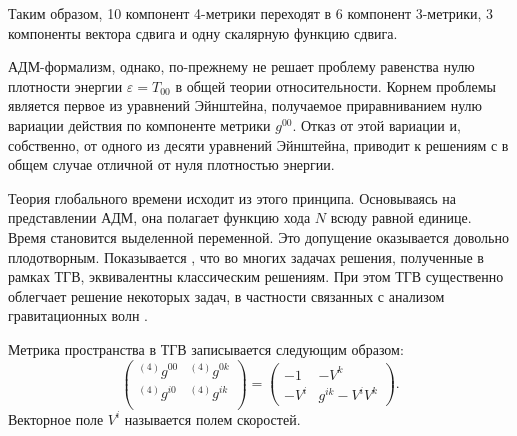 \documentclass[\docroot/reports/draft/report.tex]{subfiles}
\begin{document}
    Таким образом, 10 компонент 4-метрики переходят в 6 компонент 3-метрики, 3 компоненты вектора сдвига и одну скалярную функцию сдвига.

    АДМ-формализм, однако, по-прежнему не решает проблему равенства нулю плотности энергии $\varepsilon = T_{00}$ в общей теории относительности. Корнем проблемы является первое из уравнений Эйнштейна, получаемое приравниванием нулю вариации действия по компоненте метрики $g^{00}$. Отказ от этой вариации и, собственно, от одного из десяти уравнений Эйнштейна, приводит к решениям с в общем случае отличной от нуля плотностью энергии.

    Теория глобального времени исходит из этого принципа. Основываясь на представлении АДМ, она полагает функцию хода $N$ всюду равной единице. Время становится выделенной переменной. Это допущение оказывается довольно плодотворным. Показывается \cite{burlankov_space_dynamics,burlankov_grav_waves}, что во многих задачах решения, полученные в рамках ТГВ, эквивалентны классическим решениям. При этом ТГВ существенно облегчает решение некоторых задач, в частности связанных с анализом гравитационных волн \cite{burlankov_grav_waves}.

    Метрика пространства в ТГВ записывается следующим образом:
    \begin{equation*}
        \begin{pmatrix}
            {}^{(4)}g^{00} & {}^{(4)}g^{0k} \\
            {}^{(4)}g^{i0} & {}^{(4)}g^{ik} \\
        \end{pmatrix} =
        \begin{pmatrix}
            - 1   & - V^k \\
            - V^i & g^{ik} - V^i V^k
        \end{pmatrix} .
    \end{equation*}
    Векторное поле $V^i$ называется полем скоростей.

\end{document}
